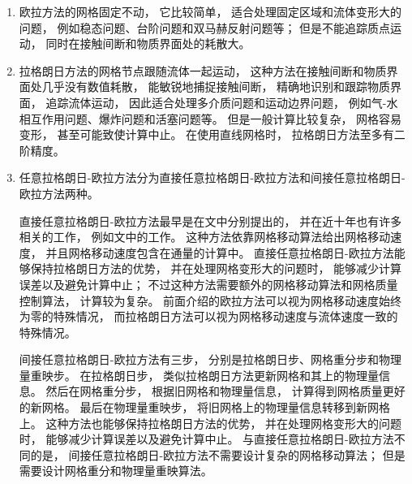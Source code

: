 \begin{enumerate}
  \item 欧拉方法的网格固定不动，
        它比较简单，
        适合处理固定区域和流体变形大的问题，
        例如稳态问题、台阶问题和双马赫反射问题等；
        但是不能追踪质点运动，
        同时在接触间断和物质界面处的耗散大。
  \item 拉格朗日方法的网格节点跟随流体一起运动，
        这种方法在接触间断和物质界面处几乎没有数值耗散，
        能敏锐地捕捉接触间断，
        精确地识别和跟踪物质界面，
        追踪流体运动，
        因此适合处理多介质问题和运动边界问题，
        例如气-水相互作用问题、爆炸问题和活塞问题等。
        但是一般计算比较复杂，
        网格容易变形，
        甚至可能致使计算中止。
        在使用直线网格时，
        拉格朗日方法至多有二阶精度。
  \item 任意拉格朗日-欧拉方法分为直接任意拉格朗日-欧拉方法和间接任意拉格朗日-欧拉方法两种。
        
        直接任意拉格朗日-欧拉方法最早是在文\cite{noh1964cel,franck1964mixed,trulio1966theory,hirt1974arbitrary}中分别提出的，
        并在近十年也有许多相关的工作，
        例如文\cite{boscheri2017high,boscheri2014direct,qi2017fully}中的工作。
        这种方法依靠网格移动算法给出网格移动速度，
        并且网格移动速度包含在通量的计算中。
        直接任意拉格朗日-欧拉方法能够保持拉格朗日方法的优势，
        并在处理网格变形大的问题时，
        能够减少计算误差以及避免计算中止；
        不过这种方法需要额外的网格移动算法和网格质量控制算法，
        计算较为复杂。
        前面介绍的欧拉方法可以视为网格移动速度始终为零的特殊情况，
        而拉格朗日方法可以视为网格移动速度与流体速度一致的特殊情况。
        
        间接任意拉格朗日-欧拉方法有三步，
        分别是拉格朗日步、网格重分步和物理量重映步。
        在拉格朗日步，
        类似拉格朗日方法更新网格和其上的物理量信息。
        然后在网格重分步，
        根据旧网格和物理量信息，
        计算得到网格质量更好的新网格。
        最后在物理量重映步，
        将旧网格上的物理量信息转移到新网格上。
        这种方法也能够保持拉格朗日方法的优势，
        并在处理网格变形大的问题时，
        能够减少计算误差以及避免计算中止。
        与直接任意拉格朗日-欧拉方法不同的是，
        间接任意拉格朗日-欧拉方法不需要设计复杂的网格移动算法；
        但是需要设计网格重分和物理量重映算法。
\end{enumerate}

